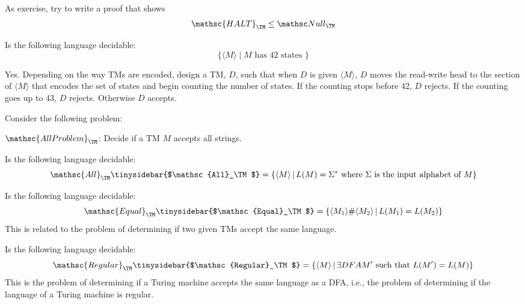 As exercise, try to write a proof that shows
\[
\mathsc{HALT}_{\TM} \leq \Null_\TM
\]

\newpage
\newcommand\NULL{\mathsc{Null}}
\begin{ex}
Is the following language decidable:
\[
\{ \langle M \rangle \mid M \text{ has 42 states } \}
\]
\end{ex}


\newpage
\SOLUTION

Yes.
Depending on the way TMs are encoded,
design a TM, $D$, such that when $D$ is given $\langle M \rangle$,
$D$ moves the
read-write head to
the section of $\langle M \rangle$ that encodes the set of states
and begin counting the number of states.
If the counting stops before 42, $D$ rejects.
If the counting goes up to 43, $D$ rejects.
Otherwise $D$ accepts.


\newpage
\newcommand\ALL{\mathsc{All}}
\begin{ex}
  Consider the following problem:

  $\mathsc{AllProblem}_\TM$:
  Decide if a TM $M$ accepts all strings.
  
Is the following language decidable:
\[
\ALL_\TM\tinysidebar{$\mathsc{All}_\TM$}\index{all$\mathsc{All}_\TM$}
= \{ \langle M \rangle  \,|\, L(M) = \Sigma^*
\text{ where $\Sigma$ is the input alphabet of $M$} \}
\]
\end{ex}


\newpage
\begin{ex}
Is the following language decidable:
\[
\mathsc{Equal}_\TM
\tinysidebar{$\mathsc{Equal}_\TM$}\index{equal$\mathsc{Equal}_\TM$}
=
\{
\langle M_1 \rangle
\#
\langle M_2 \rangle
\,|\, L(M_1) =  L(M_2)
\}
\]
This is related to the problem of determining if
two given TMs accept the same language.
\end{ex}


\newpage
\begin{ex}
Is the following language decidable:
\[
\mathsc{Regular}_\TM
\tinysidebar{$\mathsc{Regular}_\TM$}\index{regular$\mathsc{Regular}_\TM$}
=
\{
\langle M \rangle
\,|\, \exists DFA M' \text{ such that } L(M') =  L(M)
\}
\]
This is the problem of determining if a Turing machine
accepts the same language as a DFA, i.e., the problem of
determining if the language of a Turing machine is regular.
\end{ex}

